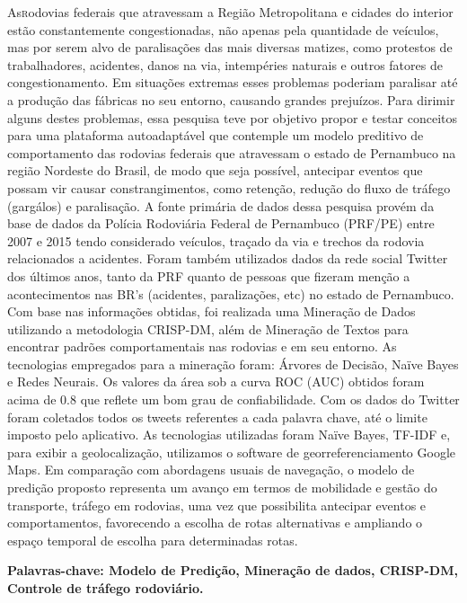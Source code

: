 \vspace*{12pt}

\lettrine {As} rodovias federais que atravessam a Região
Metropolitana e cidades do interior estão constantemente
congestionadas, não apenas pela quantidade de veículos,
mas por serem alvo de paralisações das mais diversas
matizes, como protestos de trabalhadores, acidentes,
danos na via, intempéries naturais e outros fatores de
congestionamento. Em situações extremas esses problemas
poderiam paralisar até a produção das fábricas no seu
entorno, causando grandes prejuízos. Para dirimir alguns
destes problemas, essa pesquisa teve por objetivo propor e testar conceitos 
para uma plataforma autoadaptável que contemple um modelo preditivo de comportamento das rodovias federais que
atravessam o estado de Pernambuco na região Nordeste do
Brasil, de modo que seja possível, antecipar eventos que
possam vir causar constrangimentos, como retenção, redução do fluxo de tráfego (gargálos) e paralisação. A fonte primária de dados
dessa pesquisa provém da base de dados da Polícia 
Rodoviária Federal de Pernambuco (PRF/PE) entre 2007 e 2015 tendo considerado veículos, traçado da via e trechos da
rodovia relacionados a acidentes. Foram também utilizados dados da rede social Twitter dos últimos anos, tanto da PRF quanto de 
pessoas que fizeram menção a acontecimentos nas BR's (acidentes, paralizações, etc) no estado de Pernambuco. 
Com base nas informações obtidas, foi realizada uma Mineração de Dados utilizando a metodologia CRISP-DM, além de Mineração de Textos para encontrar padrões comportamentais nas rodovias e em seu
entorno. As tecnologias empregados para a mineração foram: Árvores de Decisão, Naïve Bayes e Redes Neurais. 
Os valores da área sob a curva ROC (AUC) obtidos foram
acima de 0.8 que reflete um bom grau de confiabilidade. Com os dados do Twitter foram coletados todos os tweets referentes a cada palavra chave, até o limite imposto pelo aplicativo. As tecnologias utilizadas foram Naïve Bayes, TF-IDF e, para exibir a geolocalização, utilizamos o software de georreferenciamento Google Maps.
Em comparação com abordagens usuais de navegação, o
modelo de predição proposto representa um avanço em
termos de mobilidade e gestão do transporte, tráfego em rodovias, uma vez que possibilita antecipar eventos e
comportamentos, favorecendo a escolha de rotas alternativas e ampliando o espaço temporal de escolha para determinadas rotas. 


\par
\vspace{2em}
\noindent\textbf{Palavras-chave: Modelo de Predição, Mineração de dados, CRISP-DM, Controle de tráfego rodoviário.}